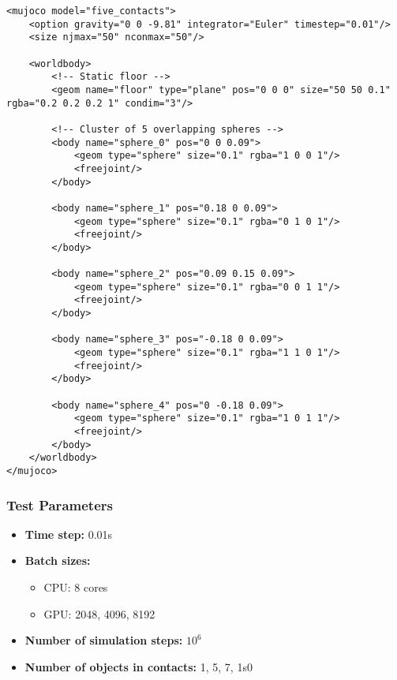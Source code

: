 \documentclass[11pt,a4paper]{article}
\begin{document}
\begin{lstlisting}[style=xmlstyle, caption={Pendulum XML model}, label=lst:pendulum_xml]
<mujoco model="five_contacts">
    <option gravity="0 0 -9.81" integrator="Euler" timestep="0.01"/>
    <size njmax="50" nconmax="50"/>

    <worldbody>
        <!-- Static floor -->
        <geom name="floor" type="plane" pos="0 0 0" size="50 50 0.1" rgba="0.2 0.2 0.2 1" condim="3"/>

        <!-- Cluster of 5 overlapping spheres -->
        <body name="sphere_0" pos="0 0 0.09">
            <geom type="sphere" size="0.1" rgba="1 0 0 1"/>
            <freejoint/>
        </body>

        <body name="sphere_1" pos="0.18 0 0.09">
            <geom type="sphere" size="0.1" rgba="0 1 0 1"/>
            <freejoint/>
        </body>

        <body name="sphere_2" pos="0.09 0.15 0.09">
            <geom type="sphere" size="0.1" rgba="0 0 1 1"/>
            <freejoint/>
        </body>

        <body name="sphere_3" pos="-0.18 0 0.09">
            <geom type="sphere" size="0.1" rgba="1 1 0 1"/>
            <freejoint/>
        </body>

        <body name="sphere_4" pos="0 -0.18 0.09">
            <geom type="sphere" size="0.1" rgba="1 0 1 1"/>
            <freejoint/>
        </body>
    </worldbody>
</mujoco>
\end{lstlisting}

\subsubsection{Test Parameters}
\begin{itemize}
    \item \textbf{Time step:} 0.01s
    \item \textbf{Batch sizes:} 
    \begin{itemize}
        \item CPU: 8 cores 
        \item GPU: 2048, 4096, 8192
    \end{itemize}
    \item \textbf{Number of simulation steps:} $10^6$
    \item \textbf{Number of objects in contacts:} 1, 5, 7, 1s0
\end{itemize}
\end{document}
